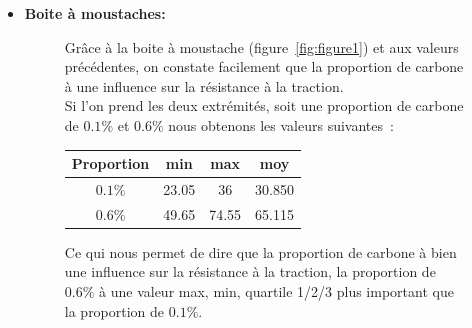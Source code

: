 \begin{itemize}
    \item \textbf{Boite à moustaches:} \\
        \begin{figure}[!h]
            \centering
            \begin{minipage}{.48\linewidth}
                Grâce à la boite à moustache (figure~\ref{fig:figure1}) et aux valeurs précédentes, on constate facilement que la proportion de carbone à une influence sur la résistance à la traction. \\
                Si l’on prend les deux extrémités, soit une proportion de carbone de $0.1\%$ et $0.6\%$ nous obtenons les valeurs suivantes~: \\
                \begin{center}
                    \begin{tabular}{| c | c | c | c |}
                        \hline
                        \textbf{Proportion} & \textbf{min} & \textbf{max} & \textbf{moy} \\ \hline
                        $0.1\%$ & 23.05 & 36 & 30.850 \\ \hline
                        $0.6\%$ & 49.65 & 74.55 & 65.115 \\ \hline
                    \end{tabular}
                \end{center}
                \vspace{.2cm}

                Ce qui nous permet de dire que la proportion de carbone à bien une influence sur la résistance à la traction, la proportion de $0.6\%$ à une valeur max, min, quartile 1/2/3 plus important 
                que la proportion de $0.1\%$.


\end{minipage}
\end{figure}
\end{itemize}

